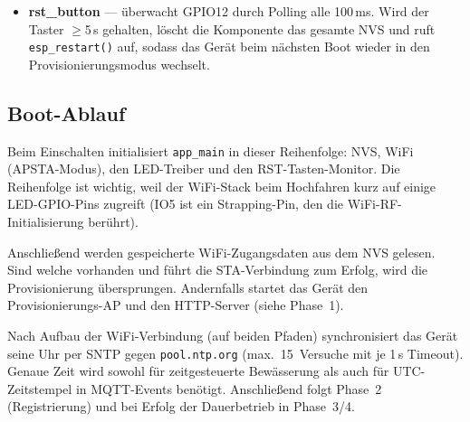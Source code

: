 \documentclass[a4paper,12pt]{article}
\begin{document}
\begin{itemize}
        als Passwort. Wiederholungen mit exponentiellem Backoff
        (1\,s bis 60\,s,
        max.\ 10~Versuche). Nach erfolgreicher Registrierung bleibt
        die MQTT-Sitzung für die Phasen~3--4 offen.
        Für die Konfiguration (Phase~3) abonniert sie
        \texttt{config/push}, validiert und persistiert empfangene
        Konfigurationen in NVS pro Port und sendet eine
        Bestätigungsnachricht. Bei Reconnect zum Broker wird das
        Abonnement automatisch erneuert.
        Für die Bewässerung (Phase~4) prüft sie alle 30\,s die
        Zeitpläne und alle 60\,s die Feuchtigkeitsschwellwerte über
        FreeRTOS-Timer. Die eigentliche Pumpensteuerung läuft pro
        Port in einem dedizierten FreeRTOS-Task mit eigener Queue,
        sodass beide Pumpen parallel arbeiten können und der
        MQTT-Keep-Alive nicht durch lange Pumpzyklen gestört wird.
        Feuchtigkeitswerte werden alle 5\,s ins Log geschrieben und
        alle 30\,s als MQTT-Telemetrie an
        \texttt{event/humidity} gesendet.
  \item \textbf{rst\_button} --- überwacht GPIO12 durch Polling alle
        100\,ms. Wird der Taster $\geq$5\,s gehalten, löscht die
        Komponente das gesamte NVS und ruft \texttt{esp\_restart()}
        auf, sodass das Gerät beim nächsten Boot wieder in den
        Provisionierungsmodus wechselt.
\end{itemize}

\subsection{Boot-Ablauf}

Beim Einschalten initialisiert \texttt{app\_main} in dieser
Reihenfolge: NVS, WiFi (APSTA-Modus), den LED-Treiber und den
RST-Tasten-Monitor. Die Reihenfolge ist wichtig, weil der WiFi-Stack
beim Hochfahren kurz auf einige LED-GPIO-Pins zugreift (IO5 ist ein
Strapping-Pin, den die WiFi-RF-Initialisierung berührt).

Anschließend werden gespeicherte WiFi-Zugangsdaten aus dem NVS
gelesen. Sind welche vorhanden und führt die STA-Verbindung zum
Erfolg, wird die Provisionierung übersprungen. Andernfalls startet
das Gerät den Provisionierungs-AP und den HTTP-Server (siehe Phase~1).

Nach Aufbau der WiFi-Verbindung (auf beiden Pfaden) synchronisiert
das Gerät seine Uhr per SNTP gegen \texttt{pool.ntp.org} (max.\
15~Versuche mit je 1\,s Timeout). Genaue Zeit wird sowohl für
zeitgesteuerte Bewässerung als auch für UTC-Zeitstempel in
MQTT-Events benötigt. Anschließend folgt Phase~2 (Registrierung)
und bei Erfolg der Dauerbetrieb in Phase~3/4.
\end{document}
